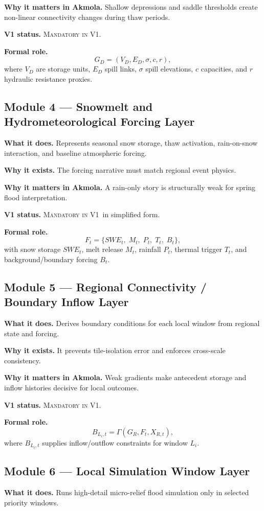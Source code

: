 \documentclass[11pt]{article}
\newcommand{\vone}{\textsc{Mandatory in V1}}
\begin{document}
\textbf{Why it matters in Akmola.} Shallow depressions and saddle thresholds create non-linear connectivity changes during thaw periods.

\textbf{V1 status.} \vone.

\textbf{Formal role.}
\[
G_D=(V_D,E_D,\sigma,c,r),
\]
where $V_D$ are storage units, $E_D$ spill links, $\sigma$ spill elevations, $c$ capacities, and $r$ hydraulic resistance proxies.

\subsection{Module 4 --- Snowmelt and Hydrometeorological Forcing Layer}
\textbf{What it does.} Represents seasonal snow storage, thaw activation, rain-on-snow interaction, and baseline atmospheric forcing.

\textbf{Why it exists.} The forcing narrative must match regional event physics.

\textbf{Why it matters in Akmola.} A rain-only story is structurally weak for spring flood interpretation.

\textbf{V1 status.} \vone\ in simplified form.

\textbf{Formal role.}
\[
F_t=\{SWE_t,\;M_t,\;P_t,\;T_t,\;B_t\},
\]
with snow storage $SWE_t$, melt release $M_t$, rainfall $P_t$, thermal trigger $T_t$, and background/boundary forcing $B_t$.

\subsection{Module 5 --- Regional Connectivity / Boundary Inflow Layer}
\textbf{What it does.} Derives boundary conditions for each local window from regional state and forcing.

\textbf{Why it exists.} It prevents tile-isolation error and enforces cross-scale consistency.

\textbf{Why it matters in Akmola.} Weak gradients make antecedent storage and inflow histories decisive for local outcomes.

\textbf{V1 status.} \vone.

\textbf{Formal role.}
\[
B_{L_i,t}=\Gamma(G_R,F_t,X_{R,t}),
\]
where $B_{L_i,t}$ supplies inflow/outflow constraints for window $L_i$.

\subsection{Module 6 --- Local Simulation Window Layer}
\textbf{What it does.} Runs high-detail micro-relief flood simulation only in selected priority windows.
\end{document}
